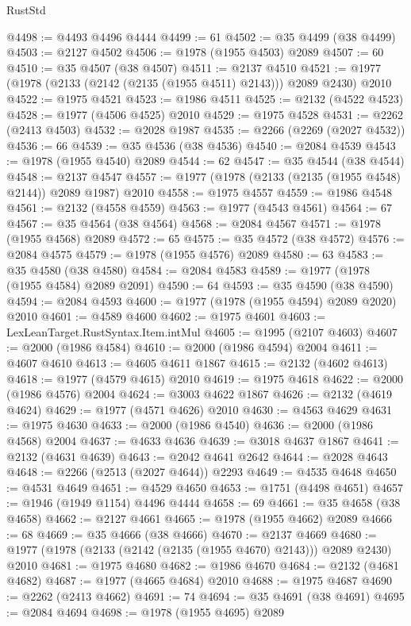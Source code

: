 \begin{lexlean}{RustStd}
\begin{coremodule}
@4498 := @4493 @4496 @4444
@4499 := 61
@4502 := @35 @4499 (@38 @4499)
@4503 := @2127 @4502
@4506 := @1978 (@1955 @4503) @2089
@4507 := 60
@4510 := @35 @4507 (@38 @4507)
@4511 := @2137 @4510
@4521 := @1977 (@1978 (@2133 (@2142 (@2135 (@1955 @4511) @2143))) @2089 @2430) @2010
@4522 := @1975 @4521
@4523 := @1986 @4511
@4525 := @2132 (@4522 @4523)
@4528 := @1977 (@4506 @4525) @2010
@4529 := @1975 @4528
@4531 := @2262 (@2413 @4503)
@4532 := @2028 @1987
@4535 := @2266 (@2269 (@2027 @4532))
@4536 := 66
@4539 := @35 @4536 (@38 @4536)
@4540 := @2084 @4539
@4543 := @1978 (@1955 @4540) @2089
@4544 := 62
@4547 := @35 @4544 (@38 @4544)
@4548 := @2137 @4547
@4557 := @1977 (@1978 (@2133 (@2135 (@1955 @4548) @2144)) @2089 @1987) @2010
@4558 := @1975 @4557
@4559 := @1986 @4548
@4561 := @2132 (@4558 @4559)
@4563 := @1977 (@4543 @4561)
@4564 := 67
@4567 := @35 @4564 (@38 @4564)
@4568 := @2084 @4567
@4571 := @1978 (@1955 @4568) @2089
@4572 := 65
@4575 := @35 @4572 (@38 @4572)
@4576 := @2084 @4575
@4579 := @1978 (@1955 @4576) @2089
@4580 := 63
@4583 := @35 @4580 (@38 @4580)
@4584 := @2084 @4583
@4589 := @1977 (@1978 (@1955 @4584) @2089 @2091)
@4590 := 64
@4593 := @35 @4590 (@38 @4590)
@4594 := @2084 @4593
@4600 := @1977 (@1978 (@1955 @4594) @2089 @2020) @2010
@4601 := @4589 @4600
@4602 := @1975 @4601
@4603 := LexLeanTarget.RustSyntax.Item.intMul
@4605 := @1995 (@2107 @4603)
@4607 := @2000 (@1986 @4584)
@4610 := @2000 (@1986 @4594) @2004
@4611 := @4607 @4610
@4613 := @4605 @4611 @1867
@4615 := @2132 (@4602 @4613)
@4618 := @1977 (@4579 @4615) @2010
@4619 := @1975 @4618
@4622 := @2000 (@1986 @4576) @2004
@4624 := @3003 @4622 @1867
@4626 := @2132 (@4619 @4624)
@4629 := @1977 (@4571 @4626) @2010
@4630 := @4563 @4629
@4631 := @1975 @4630
@4633 := @2000 (@1986 @4540)
@4636 := @2000 (@1986 @4568) @2004
@4637 := @4633 @4636
@4639 := @3018 @4637 @1867
@4641 := @2132 (@4631 @4639)
@4643 := @2042 @4641 @2642
@4644 := @2028 @4643
@4648 := @2266 (@2513 (@2027 @4644)) @2293
@4649 := @4535 @4648
@4650 := @4531 @4649
@4651 := @4529 @4650
@4653 := @1751 (@4498 @4651)
@4657 := @1946 (@1949 @1154) @4496 @4444
@4658 := 69
@4661 := @35 @4658 (@38 @4658)
@4662 := @2127 @4661
@4665 := @1978 (@1955 @4662) @2089
@4666 := 68
@4669 := @35 @4666 (@38 @4666)
@4670 := @2137 @4669
@4680 := @1977 (@1978 (@2133 (@2142 (@2135 (@1955 @4670) @2143))) @2089 @2430) @2010
@4681 := @1975 @4680
@4682 := @1986 @4670
@4684 := @2132 (@4681 @4682)
@4687 := @1977 (@4665 @4684) @2010
@4688 := @1975 @4687
@4690 := @2262 (@2413 @4662)
@4691 := 74
@4694 := @35 @4691 (@38 @4691)
@4695 := @2084 @4694
@4698 := @1978 (@1955 @4695) @2089

\end{coremodule}
\end{lexlean}
